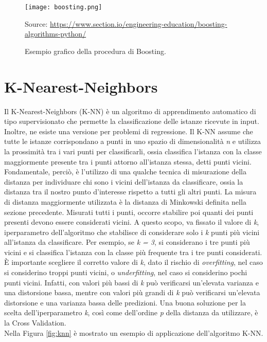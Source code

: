 \begin{figure}[h]
	\begin{center}
		\texttt{[image: boosting.png]}
		\caption{Esempio grafico della procedura di Boosting.
		} 
		Source: \url{https://www.section.io/engineering-education/boosting-algorithms-python/}\label{fig:boosting}
	\end{center}
\end{figure}

\section{K-Nearest-Neighbors}
Il K-Nearest-Neighbors (K-NN) \autocite{dasarathy1991nearest} è un algoritmo di apprendimento automatico di tipo supervisionato che permette la classificazione delle istanze ricevute in input. Inoltre, ne esiste una versione per problemi di regressione. Il K-NN assume che tutte le istanze corrispondano a punti in uno spazio di dimensionalità \emph{n} e utilizza la prossimità tra i vari punti per classificarli, ossia classifica l'istanza con la classe maggiormente presente tra i punti attorno all'istanza stessa, detti punti vicini. Fondamentale, perciò, è l'utilizzo di una qualche tecnica di misurazione della distanza per individuare chi sono i vicini dell'istanza da classificare, ossia la distanza tra il nostro punto d'interesse rispetto a tutti gli altri punti. La misura di distanza maggiormente utilizzata è la distanza di Minkowski definita nella sezione precedente. Misurati tutti i punti, occorre stabilire poi quanti dei punti presenti devono essere considerati vicini. A questo scopo, va fissato il valore di \emph{k}, iperparametro dell'algoritmo che stabilisce di considerare solo i \emph{k} punti più vicini all'istanza da classificare. Per esempio, se \emph{k = 3}, si considerano i tre punti più vicini e si classifica l'istanza con la classe più frequente tra i tre punti considerati. È importante scegliere il corretto valore di \emph{k}, dato il rischio di \emph{overfitting}, nel caso si considerino troppi punti vicini, o \emph{underfitting}, nel caso si considerino pochi punti vicini. Infatti, con valori più bassi di \emph{k} può verificarsi un'elevata varianza e una distorsione bassa, mentre con valori più grandi di \emph{k} può verificarsi un'elevata distorsione e una varianza bassa delle predizioni. Una buona soluzione per la scelta dell'iperparametro \emph{k}, così come dell'ordine \emph{p} della distanza da utilizzare, è la Cross Validation.\\
Nella Figura \ref{fig:knn} è mostrato un esempio di applicazione dell'algoritmo K-NN.\\
